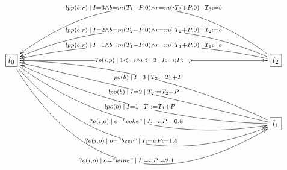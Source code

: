 $\xymatrix{
   \fbox{$l_0$} \ar[rrrrrrrrrr]|{?p(i, p)\:|\:1<=i\land i<=3\:|\:I:=i; P:=p} \ar@/_3pc/[ddrrrrrrrrrr]|{?o(i,o)\:|\:o="coke"\:|\:I:=i; P:=0.8} \ar@/_5pc/[ddrrrrrrrrrr]|{?o(i,o)\:|\:o="beer"\:|\:I:=i; P:=1.5} \ar@/_7pc/[ddrrrrrrrrrr]|{?o(i,o)\:|\:o="wine"\:|\:I:=i; P:=2.1} &&&&&&&&&& \fbox{$l_2$} \ar@/_1.5pc/[llllllllll]|{!pp(b, r)\:|\:I=1\land b=m(T_1-P,0)\land r=m(\scalebox{0.75}[1.0]{-}T_1+P,0)\:|\:T_1:=b} \ar@/_3pc/[llllllllll]|{!pp(b, r)\:|\:I=2\land b=m(T_2-P,0)\land r=m(\scalebox{0.75}[1.0]{-}T_2+P,0)\:|\:T_2:=b} \ar@/_5.2pc/[llllllllll]|{!pp(b, r)\:|\:I=3\land b=m(T_1-P,0)\land r=m(\scalebox{0.75}[1.0]{-}T_3+P,0)\:|\:T_3:=b} \\ \\
   &&&&&&&&&& \fbox{$l_1$} \ar@/^1.5pc/[uullllllllll]|{!po(b)\:|\:I=1\:|\:T_1:=T_1+P} \ar[uullllllllll]|{!po(b)\:|\:I=2\:|\:T_2:=T_2+P} \ar@/_1.5pc/[uullllllllll]|{!po(b)\:|\:I=3\:|\:T_3:=T_3+P} 
}$

